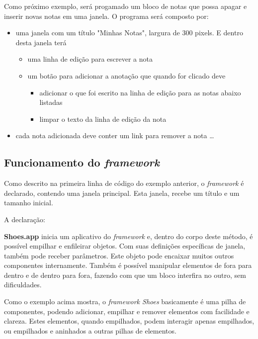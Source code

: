 \documentclass[espaco=simples,appendix=Name]{abnt}
\begin{document}
Como próximo exemplo, será progamado um bloco de notas que possa apagar e inserir novas notas em uma janela. O programa será composto por:
\begin{itemize} 
  \item uma janela com um título "Minhas Notas", largura de 300 pixels. E dentro desta janela terá 
  \begin{itemize} 
    \item uma linha de edição para escrever a nota
    \item um botão para adicionar a anotação que quando for clicado deve 
    \begin{itemize} 
      \item adicionar o que foi escrito na linha de edição para as notas abaixo listadas
      \item limpar o texto da linha de edição da nota
    \end{itemize} 
  \end{itemize} 
  \item cada nota adicionada deve conter um link para remover a nota \ldots
\end{itemize} 


\subsection { Funcionamento do \textit{framework} }

Como descrito na primeira linha de código do exemplo anterior, o \textit{framework} é declarado, contendo uma janela principal. Esta janela, recebe um título e um tamanho inicial.

A declaração:

 

\textbf{Shoes.app} inicia um aplicativo do \textit{framework} e, dentro do corpo deste método, é possível empilhar e enfileirar objetos. Com suas definições específicas de janela, também pode receber parâmetros. Este objeto pode encaixar muitos outros componentes internamente. Também é possível manipular elementos de fora para dentro e de dentro para fora, fazendo com que um bloco interfira no outro, sem dificuldades.

Como o exemplo acima mostra, o \textit{framework Shoes} basicamente é uma pilha de componentes, podendo adicionar, empilhar e remover elementos com facilidade e clareza. Estes elementos, quando empilhados, podem interagir apenas empilhados, ou empilhados e aninhados a outras pilhas de elementos. 
\end{document}

